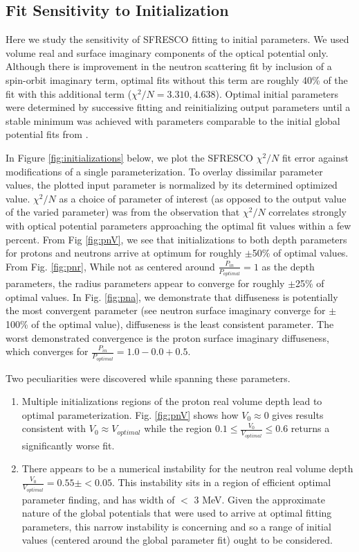 \subsection{Fit Sensitivity to Initialization}
\par
Here we study the sensitivity of SFRESCO fitting to initial parameters. We used volume real and surface imaginary components of the optical potential only. Although there is improvement in the neutron scattering fit by inclusion of a spin-orbit imaginary term, optimal fits without this term are roughly 40\% of the fit with this additional term ($\chi^2/N = 3.310, 4.638 $). Optimal initial parameters were determined by successive fitting and reinitializing output parameters until a stable minimum was achieved with parameters comparable to the initial global potential fits from \cite{capote2009ripl}.
\par
In Figure \ref{fig:initializations} below, we plot the SFRESCO $\chi^2/N$ fit error against modifications of a single parameterization. To overlay dissimilar parameter values, the plotted input parameter is normalized by its determined optimized value. $\chi^2/N$ as a choice of parameter of interest (as opposed to the output value of the varied parameter) was from the observation that  $\chi^2/N$ correlates strongly with optical potential parameters approaching the optimal fit values within a few percent. From Fig \ref{fig:pnV}, we see that initializations to both depth parameters for protons and neutrons arrive at optimum for roughly $\pm$50\% of optimal values. From Fig. \ref{fig:pnr}, While not as centered around $\frac{P_{in}}{P_{optimal}}=1$ as the depth parameters, the radius parameters appear to converge for roughly $\pm$25\% of optimal values. In Fig. \ref{fig:pna}, we demonstrate that diffuseness is potentially the most convergent parameter (see neutron surface imaginary converge for $\pm$100\% of the optimal value), diffuseness is the least consistent parameter. The worst demonstrated convergence is the proton surface imaginary diffuseness, which converges for $\frac{P_{in}}{P_{optimal}}=1.0-0.0+0.5$.
\par
Two peculiarities were discovered while spanning these parameters.
\begin{enumerate}
\item Multiple initializations regions of the proton real volume depth lead to optimal parameterization. Fig. \ref{fig:pnV} shows how $V_0\approx 0$ gives results consistent with $V_0 \approx V_{optimal}$ while the region $0.1 \leq \frac{V_0}{V_{optimal}} \leq 0.6$ returns a significantly worse fit.
\item There appears to be a numerical instability for the neutron real volume depth $\frac{V_0}{V_{optimal}} = 0.55 \pm <0.05$. This instability sits in a region of efficient optimal parameter finding, and has width of $<$ 3 MeV. Given the approximate nature of the global potentials that were used to arrive at optimal fitting parameters, this narrow instability is concerning and so a range of initial values (centered around the global parameter fit) ought to be considered. 
\end{enumerate}
